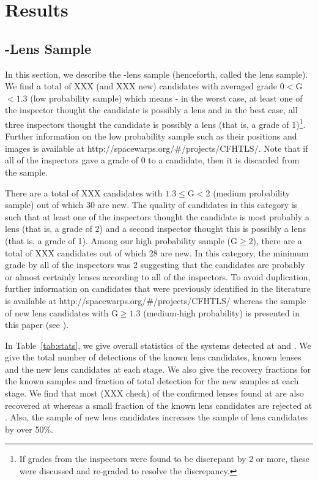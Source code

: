 \documentclass[useAMS,usenatbib,a4paper]{mn2e}
\begin{document}
\section{Results}
\label{sec:results}

\subsection{\sw-\cfhtls Lens Sample}
\label{sec:swlens}

In this section, we describe the \sw-\cfhtls lens sample (henceforth,
called the \sw lens sample). We find a total of XXX (and XXX new)
candidates with averaged grade $0<$G$<1.3$ (low probability sample)
which means - in the worst case, at least one of the inspector thought
the candidate is possibly a lens and in the best case, all three
inspectors thought the candidate is possibly a lens (that is,
a grade of 1)\footnote{If grades from the inspectors were found to be discrepant
by 2 or more, these were discussed and re-graded to resolve the
discrepancy.}. Further information on the low probability sample such as
their positions and images is available at
http://spacewarps.org/\#/projects/CFHTLS/. Note that if all of the inspectors gave
a grade of 0 to a candidate, then it is discarded from the sample. 

There are a total of XXX candidates with $1.3\le$G$<2$ (medium
probability sample) out of which 30 are new. The quality of candidates
in this category is such that at least one of the inspectors thought the
candidate is most probably a lens (that is, a grade of 2) and a second inspector
thought this is possibly a lens (that is, a grade of 1). Among our high
probability sample (G$\ge$2), there are a total of XXX candidates out of
which 28 are new. In this category, the minimum grade by all of the
inspectors was 2 suggesting that the candidates are probably or almost
certainly lenses according to all of the inspectors. To avoid
duplication, further information on \sw candidates that were previously
identified in the literature is available at
http://spacewarps.org/\#/projects/CFHTLS/ whereas the sample of new lens
candidates with G$\ge 1.3$ (medium-high probability) is presented in this paper (see
).

In Table~\ref{tab:stats}, we give overall statistics of the systems
detected at \StageOne and \StageTwo. We give the total number of
detections of the known lens candidates, known lenses and the new lens
candidates at each stage.  We also give the recovery fractions for the
known samples and fraction of total detection for the new samples at
each stage. We find that most (XXX check) of the confirmed lenses found
at \StageOne are also recovered at \StageTwo whereas a small fraction of
the known lens candidates are rejected at \StageTwo. Also, the sample of
new lens candidates increases the sample of \cfhtls lens candidates by
over 50\%.
\end{document}
